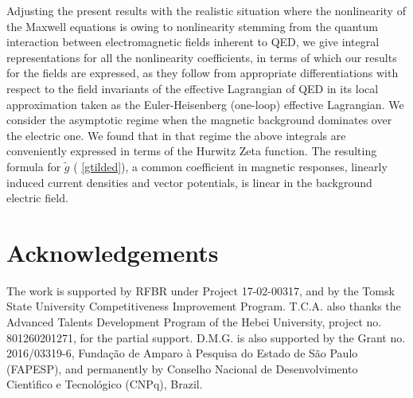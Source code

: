 \documentclass[12pt]{article}
\begin{document}
Adjusting the present results with the realistic situation where the
nonlinearity of the Maxwell equations is owing to nonlinearity stemming from
the quantum interaction between electromagnetic fields inherent to QED, we
give integral representations for all the nonlinearity coefficients, in
terms of which our results for the fields are expressed, as they follow from
appropriate differentiations with respect to the field invariants of the
effective Lagrangian of QED in its local approximation taken as the
Euler-Heisenberg (one-loop) effective Lagrangian. We consider the asymptotic
regime when the magnetic background dominates over the electric one. We
found that in that regime the above integrals are conveniently expressed in
terms of the Hurwitz Zeta function. The resulting formula for $\tilde{g}$ (%
\ref{gtilded}), a common coefficient in magnetic responses, linearly induced
current densities and vector potentials, is linear in the background
electric field.

\section*{Acknowledgements}

The work is supported by RFBR under Project 17-02-00317, and by the Tomsk State University Competitiveness Improvement Program. T.C.A. also thanks the Advanced Talents Development Program of the Hebei University, project no. 801260201271, for the partial support. D.M.G. is also supported by the Grant no. 2016/03319-6, Funda\c{c}\~{a}o de Amparo \`{a} Pesquisa do
Estado de S\~{a}o Paulo (FAPESP), and permanently by Conselho Nacional de
Desenvolvimento Cient\'{\i}fico e Tecnol\'{o}gico (CNPq), Brazil.
\end{document}
